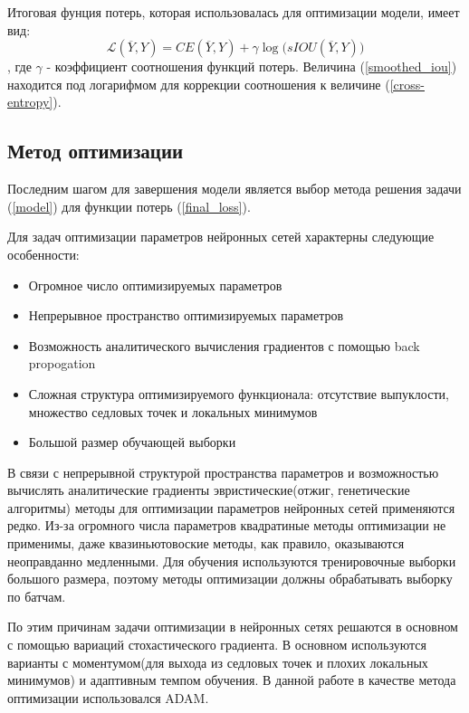 \documentclass[14pt, a4paper, oneside, bold]{extarticle}
\begin{document}
Итоговая фунция потерь, которая использовалась для оптимизации модели, имеет вид:
\begin{equation} \label{final_loss}
	\mathcal{L}(\overline{Y}, Y) = CE(\overline{Y}, Y)
		+ \gamma \log \bigl( sIOU(\overline{Y}, Y) \bigr)
\end{equation}
, где $\gamma$ - коэффициент соотношения функций потерь. Величина (\ref{smoothed_iou}) находится под логарифмом для коррекции соотношения к величине (\ref{cross-entropy}).

\subsection{Метод оптимизации}

Последним шагом для завершения модели является выбор метода решения 
задачи (\ref{model}) для функции потерь (\ref{final_loss}).

Для задач оптимизации параметров нейронных сетей характерны следующие особенности:
\begin{itemize}
	\item Огромное число оптимизируемых параметров
	
	\item Непрерывное пространство оптимизируемых параметров
	
	\item Возможность аналитического вычисления градиентов с помощью
back propogation
		
	\item Сложная структура оптимизируемого функционала: отсутствие 	выпуклости, множество седловых точек и локальных минимумов
	
	\item Большой размер обучающей выборки  
\end{itemize} 
	
В связи с непрерывной структурой пространства параметров и возможностью вычислять аналитические градиенты эвристические(отжиг, генетические алгоритмы) методы для оптимизации параметров нейронных сетей применяются редко. Из-за огромного числа параметров квадратиные методы оптимизации не применимы, даже квазиньютовоские методы, как правило, оказываются неоправданно медленными. Для обучения используются тренировочные выборки большого размера, поэтому методы оптимизации должны обрабатывать выборку по батчам. 

По этим причинам задачи оптимизации в нейронных сетях решаются в основном с помощью вариаций стохастического градиента. В основном используются варианты с моментумом(для выхода из седловых точек и плохих локальных минимумов) и адаптивным темпом обучения. В данной работе в качестве метода оптимизации использовался ADAM.
\end{document}
